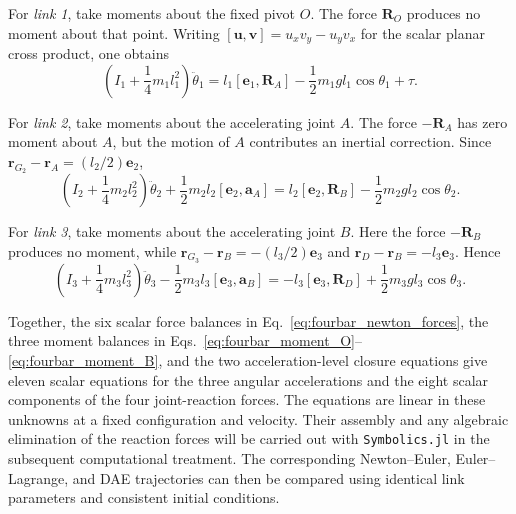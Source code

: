 For \emph{link 1}, take moments about the fixed pivot $O$. The force $\mathbf R_O$ produces no moment about that point. Writing $[\mathbf u,\mathbf v]=u_xv_y-u_yv_x$ for the scalar planar cross product, one obtains
\begin{equation}
    \left(I_1+\frac14m_1l_1^2\right)\ddot\theta_1
    =l_1[\mathbf e_1,\mathbf R_A]
     -\frac12m_1gl_1\cos\theta_1+\tau.
    \label{eq:fourbar_moment_O}
\end{equation}

For \emph{link 2}, take moments about the accelerating joint $A$. The force $-\mathbf R_A$ has zero moment about $A$, but the motion of $A$ contributes an inertial correction. Since $\mathbf r_{G_2}-\mathbf r_A=(l_2/2)\mathbf e_2$,
\begin{equation}
    \left(I_2+\frac14m_2l_2^2\right)\ddot\theta_2
    +\frac12m_2l_2[\mathbf e_2,\mathbf a_A]
    =l_2[\mathbf e_2,\mathbf R_B]
     -\frac12m_2gl_2\cos\theta_2.
    \label{eq:fourbar_moment_A}
\end{equation}

For \emph{link 3}, take moments about the accelerating joint $B$. Here the force $-\mathbf R_B$ produces no moment, while $\mathbf r_{G_3}-\mathbf r_B=-(l_3/2)\mathbf e_3$ and $\mathbf r_D-\mathbf r_B=-l_3\mathbf e_3$. Hence
\begin{equation}
    \left(I_3+\frac14m_3l_3^2\right)\ddot\theta_3
    -\frac12m_3l_3[\mathbf e_3,\mathbf a_B]
    =-l_3[\mathbf e_3,\mathbf R_D]
     +\frac12m_3gl_3\cos\theta_3.
    \label{eq:fourbar_moment_B}
\end{equation}

Together, the six scalar force balances in Eq.~\eqref{eq:fourbar_newton_forces}, the three moment balances in Eqs.~\eqref{eq:fourbar_moment_O}--\eqref{eq:fourbar_moment_B}, and the two acceleration-level closure equations give eleven scalar equations for the three angular accelerations and the eight scalar components of the four joint-reaction forces. The equations are linear in these unknowns at a fixed configuration and velocity. Their assembly and any algebraic elimination of the reaction forces will be carried out with \texttt{Symbolics.jl} in the subsequent computational treatment. The corresponding Newton--Euler, Euler--Lagrange, and DAE trajectories can then be compared using identical link parameters and consistent initial conditions.
